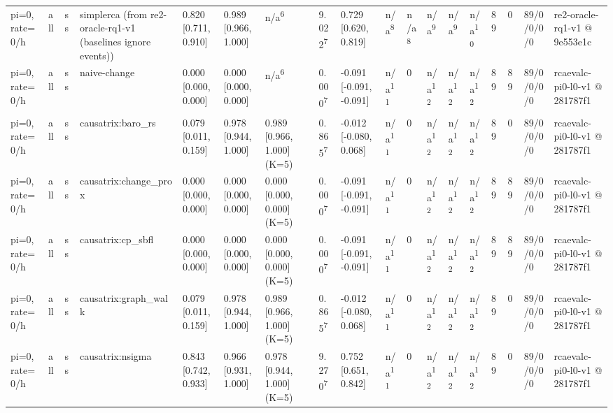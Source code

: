 \begin{table}[t]
\begin{tabular}{llllllllllllllllll}
pi=0, rate=0/h & all & ss & simplerca (from re2-oracle-rq1-v1 (baselines ignore events)) & 0.820 [0.711, 0.910] & 0.989 [0.966, 1.000] & n/a\textsuperscript{6} & 9.022\textsuperscript{7} & 0.729 [0.620, 0.819] & n/a\textsuperscript{8} & n/a\textsuperscript{8} & n/a\textsuperscript{9} & n/a\textsuperscript{9} & n/a\textsuperscript{10} & 89 & 0 & 89/0/0/0/0 & re2-oracle-rq1-v1 @ 9e553e1c \\
pi=0, rate=0/h & all & ss & naive-change & 0.000 [0.000, 0.000] & 0.000 [0.000, 0.000] & n/a\textsuperscript{6} & 0.000\textsuperscript{7} & -0.091 [-0.091, -0.091] & n/a\textsuperscript{11} & 0 & n/a\textsuperscript{12} & n/a\textsuperscript{12} & n/a\textsuperscript{12} & 89 & 89 & 89/0/0/0/0 & rcaevalc-pi0-l0-v1 @ 281787f1 \\
pi=0, rate=0/h & all & ss & causatrix:baro\_rs & 0.079 [0.011, 0.159] & 0.978 [0.944, 1.000] & 0.989 [0.966, 1.000] (K=5) & 0.865\textsuperscript{7} & -0.012 [-0.080, 0.068] & n/a\textsuperscript{11} & 0 & n/a\textsuperscript{12} & n/a\textsuperscript{12} & n/a\textsuperscript{12} & 89 & 0 & 89/0/0/0/0 & rcaevalc-pi0-l0-v1 @ 281787f1 \\
pi=0, rate=0/h & all & ss & causatrix:change\_prox & 0.000 [0.000, 0.000] & 0.000 [0.000, 0.000] & 0.000 [0.000, 0.000] (K=5) & 0.000\textsuperscript{7} & -0.091 [-0.091, -0.091] & n/a\textsuperscript{11} & 0 & n/a\textsuperscript{12} & n/a\textsuperscript{12} & n/a\textsuperscript{12} & 89 & 89 & 89/0/0/0/0 & rcaevalc-pi0-l0-v1 @ 281787f1 \\
pi=0, rate=0/h & all & ss & causatrix:cp\_sbfl & 0.000 [0.000, 0.000] & 0.000 [0.000, 0.000] & 0.000 [0.000, 0.000] (K=5) & 0.000\textsuperscript{7} & -0.091 [-0.091, -0.091] & n/a\textsuperscript{11} & 0 & n/a\textsuperscript{12} & n/a\textsuperscript{12} & n/a\textsuperscript{12} & 89 & 89 & 89/0/0/0/0 & rcaevalc-pi0-l0-v1 @ 281787f1 \\
pi=0, rate=0/h & all & ss & causatrix:graph\_walk & 0.079 [0.011, 0.159] & 0.978 [0.944, 1.000] & 0.989 [0.966, 1.000] (K=5) & 0.865\textsuperscript{7} & -0.012 [-0.080, 0.068] & n/a\textsuperscript{11} & 0 & n/a\textsuperscript{12} & n/a\textsuperscript{12} & n/a\textsuperscript{12} & 89 & 0 & 89/0/0/0/0 & rcaevalc-pi0-l0-v1 @ 281787f1 \\
pi=0, rate=0/h & all & ss & causatrix:nsigma & 0.843 [0.742, 0.933] & 0.966 [0.931, 1.000] & 0.978 [0.944, 1.000] (K=5) & 9.270\textsuperscript{7} & 0.752 [0.651, 0.842] & n/a\textsuperscript{11} & 0 & n/a\textsuperscript{12} & n/a\textsuperscript{12} & n/a\textsuperscript{12} & 89 & 0 & 89/0/0/0/0 & rcaevalc-pi0-l0-v1 @ 281787f1 \\

\end{tabular}
\end{table}
